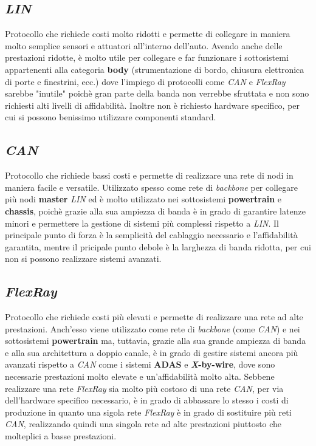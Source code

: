 \subsection{\emph{LIN}}
Protocollo che richiede costi molto ridotti e permette di collegare in maniera molto semplice sensori e attuatori all'interno dell'auto. Avendo anche delle prestazioni ridotte, è molto utile per collegare e far funzionare i sottosistemi appartenenti alla categoria \textbf{body} (strumentazione di bordo, chiusura elettronica di porte e finestrini, ecc.) dove l'impiego di protocolli come \emph{CAN} e \emph{FlexRay} sarebbe "inutile" poichè gran parte della banda non verrebbe sfruttata e non sono richiesti alti livelli di affidabilità. Inoltre non è richiesto hardware specifico, per cui si possono benissimo utilizzare componenti standard. \cite{huang_2019_invehicle}

\subsection{\emph{CAN}}
Protocollo che richiede bassi costi e permette di realizzare una rete di nodi in maniera facile e versatile. Utilizzato spesso come rete di \emph{backbone} per collegare più nodi \textbf{master} \emph{LIN} ed è molto utilizzato nei sottosistemi \textbf{powertrain} e \textbf{chassis}, poichè grazie alla sua ampiezza di banda è in grado di garantire latenze minori e permettere la gestione di sistemi più complessi rispetto a \emph{LIN}. Il principale punto di forza è la semplicità del cablaggio necessario e l'affidabilità garantita, mentre il pricipale punto debole è la larghezza di banda ridotta, per cui non si possono realizzare sistemi avanzati. \cite{huang_2019_invehicle}
\subsection{\emph{FlexRay}}
Protocollo che richiede costi più elevati e permette di realizzare una rete ad alte prestazioni. Anch'esso viene utilizzato come rete di \emph{backbone} (come \emph{CAN}) e nei sottosistemi \textbf{powertrain} ma, tuttavia, grazie alla sua grande ampiezza di banda e alla sua architettura a doppio canale, è in grado di gestire sistemi ancora più avanzati rispetto a \emph{CAN} come i sistemi \textbf{ADAS} e \textbf{\emph{X}-by-wire}, dove sono necessarie prestazioni molto elevate e un'affidabilità molto alta. Sebbene realizzare una rete \emph{FlexRay} sia molto più costoso di una rete \emph{CAN}, per via dell'hardware specifico necessario, è in grado di abbassare lo stesso i costi di produzione in quanto una sigola rete \emph{FlexRay} è in grado di sostituire più reti \emph{CAN}, realizzando quindi una singola rete ad alte prestazioni piuttosto che molteplici a basse prestazioni. \cite{huang_2019_invehicle}


